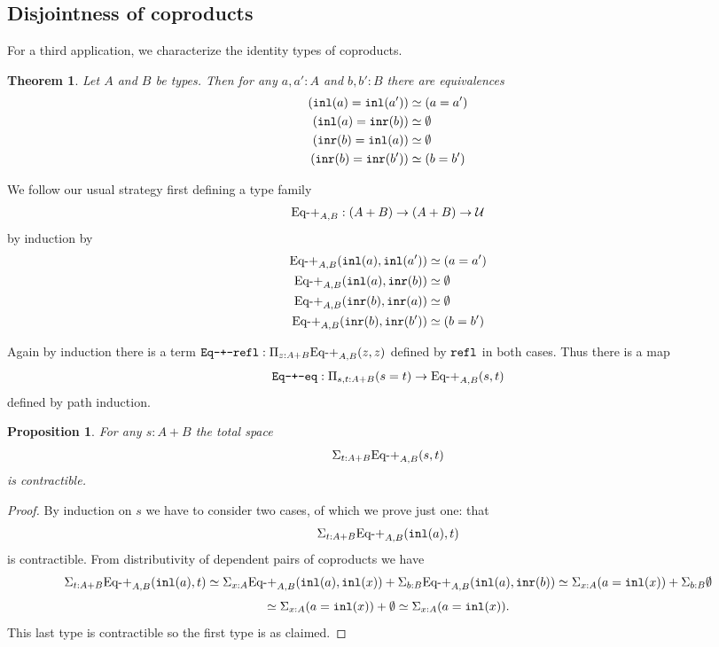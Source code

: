 \documentclass{amsart}
\theoremstyle{theorem}
\newtheorem*{thm}{Theorem}
\newtheorem*{prop}{Proposition}
\theoremstyle{definition}
\theoremstyle{remark}
\newcommand{\0}{\mathbbe{0}}
\newcommand{\1}{\mathbbe{1}}
\newcommand{\2}{\mathbbe{2}}
\newcommand{\3}{\mathbbe{3}}
\newcommand{\4}{\mathbbe{4}}
\newcommand{\term}[1]{{\textup{\texttt{#1}}}}
\newcommand{\type}[1]{{\textup{#1}}}
\newcommand{\inl}{\term{inl}}
\newcommand{\inr}{\term{inr}}
\newcommand{\refl}{\term{refl}}
\newcommand{\UU}{{\mathcal{U}}}
\begin{document}
\subsection*{Disjointness of coproducts}

For a third application, we characterize the identity types of coproducts.

\begin{thm} Let $A$ and $B$ be types. Then for any $a,a' :A$ and $b,b': B$ there are equivalences
\begin{align*} (\inl(a) = \inl(a')) &\simeq (a = a')  \\ (\inl(a) = \inr(b)) &\simeq \emptyset \\ (\inr(b) = \inl(a)) &\simeq \emptyset \\ (\inr(b) = \inr(b')) &\simeq (b = b')
\end{align*}
\end{thm}

We follow our usual strategy first defining a type family
\[ \type{Eq-+}_{A,B} : (A+B) \to (A+B) \to \UU\] 
by induction by
\begin{align*} \type{Eq-+}_{A,B}(\inl(a),\inl(a')) &\simeq (a = a')  \\ \type{Eq-+}_{A,B}(\inl(a),\inr(b)) &\simeq \emptyset \\ \type{Eq-+}_{A,B}(\inr(b),\inr(a)) &\simeq \emptyset \\ \type{Eq-+}_{A,B} (\inr(b), \inr(b')) &\simeq (b = b')
\end{align*}

Again by induction there is a term $\term{Eq-+-refl} : \Pi_{z:A+B} \type{Eq-+}_{A,B}(z,z)$ defined by $\refl$ in both cases. Thus there is a map
\[ \term{Eq-+-eq}: \Pi_{s,t:A+B} (s=t) \to \type{Eq-+}_{A,B}(s,t)\]
defined by path induction. 

\begin{prop} For any $s : A +B$ the total space
\[ \Sigma_{t:A+B}\type{Eq-+}_{A,B}(s,t)\]
is contractible.
\end{prop}
\begin{proof}
By induction on $s$ we have to consider two cases, of which we prove just one: that 
\[ \Sigma_{t:A+B}\type{Eq-+}_{A,B}(\inl(a),t)\]
is contractible. From distributivity of dependent pairs of coproducts we have
\[ \Sigma_{t:A+B}\type{Eq-+}_{A,B}(\inl(a),t) \simeq \Sigma_{x:A} \type{Eq-+}_{A,B}(\inl(a),\inl(x)) + \Sigma_{b:B} \type{Eq-+}_{A,B}(\inl(a),\inr(b)) \simeq \Sigma_{x:A} (a = \inl(x)) + \Sigma_{b:B} \emptyset\]
\[ \simeq  \Sigma_{x:A} (a = \inl(x)) + \emptyset \simeq  \Sigma_{x:A} (a = \inl(x)).  \]
This last type is contractible so the first type is as claimed.
\end{proof}
\end{document}
